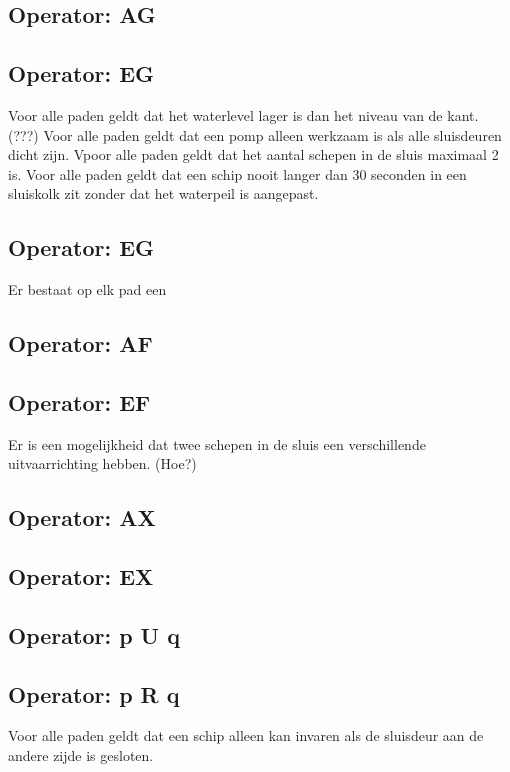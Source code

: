 \documentclass{article}
\begin{document}
	\subsection{Operator: AG}

	\subsection{Operator: EG}
	

	Voor alle paden geldt dat het  waterlevel lager is dan het  niveau van de kant. (???)
	Voor alle paden geldt dat een pomp alleen werkzaam is als alle sluisdeuren dicht zijn.
	Vpoor alle paden geldt dat het aantal schepen in de sluis maximaal 2 is.
	Voor alle paden  geldt dat een schip nooit langer dan 30 seconden in een sluiskolk zit zonder dat het waterpeil is aangepast.
	\subsection{Operator: EG}
	Er bestaat op elk pad een 

	\subsection{Operator: AF}
	
	\subsection{Operator: EF}
	Er is een mogelijkheid dat twee schepen in de sluis een verschillende uitvaarrichting hebben. (Hoe?)
	\subsection{Operator: AX}

	
	\subsection{Operator: EX}
	
	\subsection{Operator: p U q}
	
	\subsection{Operator: p R q}
	

	Voor alle paden geldt dat een schip alleen kan invaren als de sluisdeur aan de andere zijde is gesloten.
\end{document}
